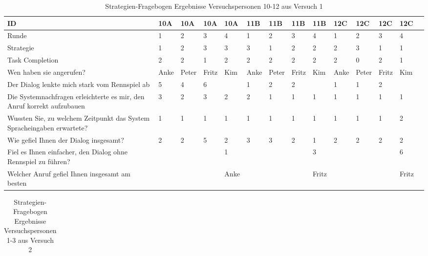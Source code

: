 \documentclass[12pt,a4paper]{scrartcl}
\begin{document}
\begin{appendix}
\begin{table}
\caption{Strategien-Fragebogen Ergebnisse Versuchspersonen 10-12 aus Versuch 1}
\begin{tabular}{|p{6cm}| p{0.8cm} | p{0.8cm} | p{0.8cm} | p{0.8cm} || p{0.8cm} | p{0.8cm} | p{0.8cm} | p{0.8cm} || p{0.8cm} | p{0.8cm} | p{0.8cm} | p{0.8cm} | p{} | }
\hline
ID & 10A & 10A & 10A & 10A & 11B & 11B & 11B & 11B & 12C & 12C & 12C & 12C \\ \hline \hline
Runde & 1 & 2 & 3 & 4 & 1 & 2 & 3 & 4 & 1 & 2 & 3 & 4 \\ \hline
	Strategie & 1 & 2 & 3 & 3 & 3 & 1 & 2 & 2 & 2 & 3 & 1 & 1 \\ \hline \hline
	Task Completion & 2 & 2 & 1 & 2 & 2 & 2 & 2 & 2 & 2 & 0 & 2 & 1 \\ \hline \hline
	Wen haben sie angerufen? & Anke & Peter & Fritz & Kim & Anke & Peter & Fritz & Kim & Anke & Peter & Fritz & Kim \\ \hline
	Der Dialog lenkte mich stark vom Rennspiel ab & 5 & 4 & 6 &  & 1 & 2 & 2 &  & 1 & 1 & 2 &  \\ \hline
	Die Systemnachfragen erleichterte es mir, den Anruf korrekt aufzubauen & 3 & 2 & 3 & 2 & 2 & 1 & 1 & 1 & 1 & 1 & 1 & 1 \\ \hline
	Wussten Sie, zu welchem Zeitpunkt das System Spracheingaben erwartete? & 1 & 1 & 1 & 1 & 1 & 1 & 1 & 1 & 1 & 1 & 1 & 2 \\ \hline
	Wie gefiel Ihnen der Dialog insgesamt? & 2 & 2 & 5 & 2 & 3 & 3 & 2 & 1 & 2 & 2 & 2 & 2 \\ \hline
	Fiel es Ihnen einfacher, den Dialog ohne Rennspiel zu führen? &  &  &  & 1 &  &  &  & 3 &  &  &  & 6 \\ \hline
	Welcher Anruf gefiel Ihnen insgesamt am besten &  &  &  & Anke &  &  &  & Fritz &  &  &  & Fritz \\ \hline
\end{tabular}
\end{table}


\begin{table}
\caption{Strategien-Fragebogen Ergebnisse Versuchspersonen 1-3 aus Versuch 2}
\begin{tabular}{|p{6cm}| p{0.8cm} | p{0.8cm} | p{0.8cm} | p{0.8cm} || p{0.8cm} | p{0.8cm} | p{0.8cm} | p{0.8cm} || p{0.8cm} | p{0.8cm} | p{0.8cm} | p{0.8cm} | p{} | }
\hline


\end{tabular}
\end{table}
\end{appendix}
\end{document}
